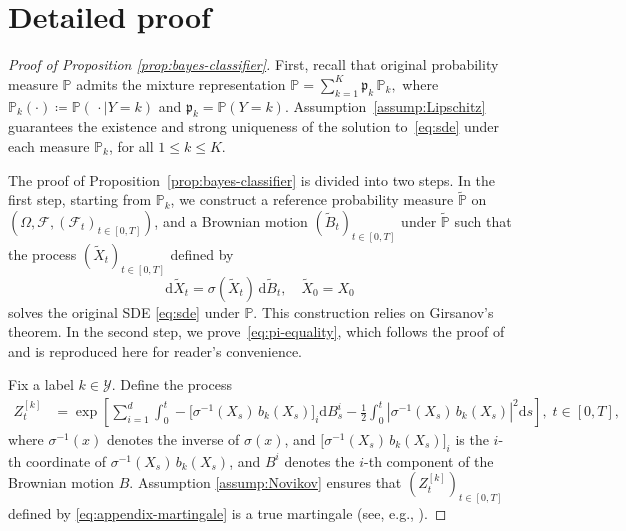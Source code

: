 \documentclass{article}
\theoremstyle{plain}
\theoremstyle{definition}
\theoremstyle{remark}
\renewcommand{\d}{\mathrm{d}}
\begin{document}
\section{Detailed proof}\label{sec:app-a}
\begin{proof}[Proof of Proposition \ref{prop:bayes-classifier}]
First, recall that original probability measure $\mathbb{P}$ admits the mixture representation
$
\mathbb{P} = \sum_{k=1}^K \mathfrak{p}_k \, \mathbb{P}_k,
$ 
where $\mathbb{P}_k(\cdot) \coloneqq \mathbb{P}(\,\cdot \mid Y = k)$ and $\mathfrak{p}_k = \mathbb{P}(Y = k)$. Assumption~\ref{assump:Lipschitz} guarantees the existence and strong uniqueness of the solution to~\eqref{eq:sde} under each measure $\mathbb{P}_k$, for all $1 \le k \le K$. 

The proof of Proposition~\ref{prop:bayes-classifier} is divided into two steps. 
In the first step, starting from $\mathbb{P}_k$, we construct a reference probability measure $\tilde{\mathbb{P}}$ on $(\Omega, \mathcal{F}, (\mathcal{F}_t)_{t\in[0,T]})$, and a Brownian motion $(\tilde{B}_t)_{t\in[0,T]}$ under $\tilde{\mathbb{P}}$ such that the process $(\tilde{X}_t)_{t\in[0,T]}$ defined by
\begin{equation}\label{eq:driftless-sde}
\d \tilde{X}_t = \sigma(\tilde{X}_t)\,\d \tilde{B}_t,\quad\tilde{X}_0=X_0    
\end{equation}
solves the original SDE \eqref{eq:sde} under ${\mathbb{P}}$.  This construction relies on Girsanov's theorem.  In the second step, we prove~\eqref{eq:pi-equality}, which follows the proof of~\citet[Proposition~1]{Denis2020} and is reproduced here for  reader’s convenience.

 Fix a label $k \in \mathcal{Y}$.
Define the process
\begin{align}\label{eq:appendix-martingale}
    Z_t^{[k]} %
    & = \exp \left[\sum_{i=1}^d \int_{0}^t - \big[\sigma^{-1}(X_s)\,b_k(X_s)\big]_i \d B_s^i -\frac{1}{2}\int_{0}^t |\sigma^{-1}(X_s)\,b_k(X_s)|^2\d s\right], \; t\in[0,T],
\end{align}
where $\sigma^{-1}(x)$ denotes the inverse of $\sigma(x)$, and $\big[\sigma^{-1}(X_s)\,b_k(X_s)\big]_i$ is the $i$-th coordinate of $\sigma^{-1}(X_s)\,b_k(X_s)$, and $B^i$ denotes the $i$-th component of the
Brownian motion $B$. Assumption \ref{assump:Novikov} ensures that $(Z^{[k]}_t)_{t\in[0,T]}$ defined by \eqref{eq:appendix-martingale} is a true martingale (see, e.g., \citet[Corollary 5.13]{karatzas1991brownian}).
 

\end{proof}
\end{document}
